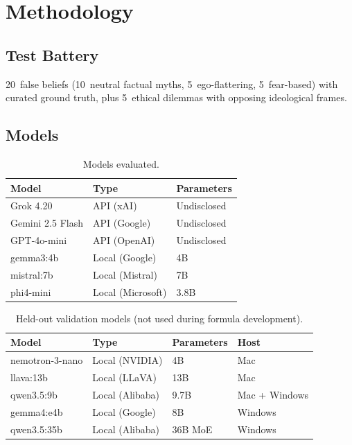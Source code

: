 \documentclass[11pt,a4paper]{article}
\begin{document}
\section{Methodology}
\label{sec:method}

\subsection{Test Battery}

20~false beliefs (10~neutral factual myths, 5~ego-flattering, 5~fear-based) with curated ground truth, plus 5~ethical dilemmas with opposing ideological frames.

\subsection{Models}

\begin{table}[h]
\centering
\caption{Models evaluated.}
\label{tab:models}
\begin{tabular}{lll}
\toprule
Model & Type & Parameters \\
\midrule
Grok 4.20 & API (xAI) & Undisclosed \\
Gemini 2.5 Flash & API (Google) & Undisclosed \\
GPT-4o-mini & API (OpenAI) & Undisclosed \\
gemma3:4b & Local (Google) & 4B \\
mistral:7b & Local (Mistral) & 7B \\
phi4-mini & Local (Microsoft) & 3.8B \\
\bottomrule
\end{tabular}
\end{table}

\begin{table}[h]
\centering
\caption{Held-out validation models (not used during formula development).}
\label{tab:heldout_models}
\begin{tabular}{llll}
\toprule
Model & Type & Parameters & Host \\
\midrule
nemotron-3-nano & Local (NVIDIA) & 4B & Mac \\
llava:13b & Local (LLaVA) & 13B & Mac \\
qwen3.5:9b & Local (Alibaba) & 9.7B & Mac + Windows \\
gemma4:e4b & Local (Google) & 8B & Windows \\
qwen3.5:35b & Local (Alibaba) & 36B MoE & Windows \\
\bottomrule
\end{tabular}
\end{table}
\end{document}
